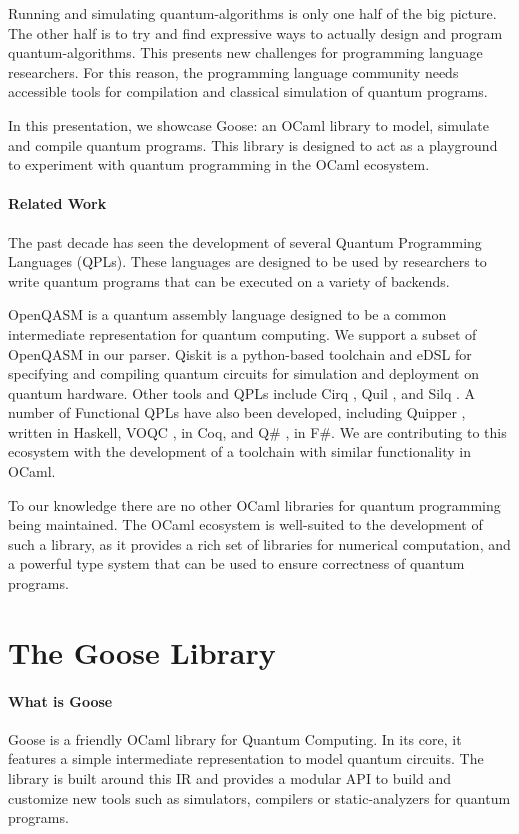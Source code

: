 \documentclass[a4paper]{easychair}
\begin{document}
Running and simulating quantum-algorithms is only one half of the big picture. The other half is to try and find expressive ways to actually design and program quantum-algorithms. This presents new challenges for programming language researchers. For this reason, the programming language community needs accessible tools for compilation and classical simulation of quantum programs.

In this presentation, we showcase Goose: an OCaml library to model, simulate and compile quantum programs. This library is designed to act as a playground to experiment with quantum programming in the OCaml ecosystem.

\paragraph*{Related Work}

The past decade has seen the development of several Quantum Programming Languages (QPLs). These languages are designed to be used by researchers to write quantum programs that can be executed on a variety of backends. 

OpenQASM \cite{Cross2022} is a quantum assembly language designed to be a common intermediate representation for quantum computing.  We support a subset of OpenQASM in our parser. Qiskit \cite{Qiskit} is a python-based toolchain and eDSL for specifying and compiling quantum circuits for simulation and deployment on quantum hardware. Other tools and QPLs include Cirq \cite{Cirq2018}, Quil \cite{Quil2016}, and Silq \cite{Bichsel2020}. A number of Functional QPLs have also been developed, including Quipper \cite{Green2013}, written in Haskell, VOQC \cite{Hietala2021}, in Coq, and Q\# \cite{Svore2018}, in F\#. We are contributing to this ecosystem with the development of a toolchain with similar functionality in OCaml.

To our knowledge there are no other OCaml libraries for quantum programming being maintained. The OCaml ecosystem is well-suited to the development of such a library, as it provides a rich set of libraries for numerical computation, and a powerful type system that can be used to ensure correctness of quantum programs.

\section{The Goose Library}

\paragraph*{What is Goose} Goose is a friendly OCaml library for Quantum Computing. In its core, it features a simple intermediate representation to model quantum circuits. The library is built around this IR and provides a modular API to build and customize new tools such as simulators, compilers or static-analyzers for quantum programs.
\end{document}
